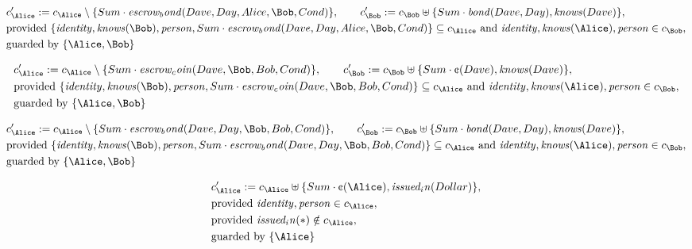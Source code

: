 \begin{align*}
&
c'_
{
\Alice
}
 := 
c_
{
\Alice
}
 \setminus 
\{
Sum
\cdot
\mathit{
escrow_bond
}
(
Dave
,
Day
,
Alice
,
\Bob
,
Cond
)
\}
, \qquad 
c'_
{
\Bob
}
 := 
c_
{
\Bob
}
 \uplus 
\{
Sum
\cdot
\mathit{
bond
}
(
Dave
,
Day
)
,
\mathit{
knows
}
(
Dave
)
\}
,\\
&
\text{provided } 
\{
\mathit{
identity
}
,
\mathit{
knows
}
(
\Bob
)
,
\mathit{
person
}
,
Sum
\cdot
\mathit{
escrow_bond
}
(
Dave
,
Day
,
Alice
,
\Bob
,
Cond
)
\}
 \subseteq c_
{
\Alice
}
 \text{ and } 
\mathit{
identity
}
,
\mathit{
knows
}
(
\Alice
)
,
\mathit{
person
}
 \in c_
{
\Bob
}
,\\
&
\text{guarded by } \{
\Alice
,
\Bob
\}
\end{align*}

\begin{align*}
&
c'_
{
\Alice
}
 := 
c_
{
\Alice
}
 \setminus 
\{
Sum
\cdot
\mathit{
escrow_coin
}
(
Dave
,
\Bob
,
Bob
,
Cond
)
\}
, \qquad 
c'_
{
\Bob
}
 := 
c_
{
\Bob
}
 \uplus 
\{
Sum
\cdot
\text{\textcent}
(
Dave
)
,
\mathit{
knows
}
(
Dave
)
\}
,\\
&
\text{provided } 
\{
\mathit{
identity
}
,
\mathit{
knows
}
(
\Bob
)
,
\mathit{
person
}
,
Sum
\cdot
\mathit{
escrow_coin
}
(
Dave
,
\Bob
,
Bob
,
Cond
)
\}
 \subseteq c_
{
\Alice
}
 \text{ and } 
\mathit{
identity
}
,
\mathit{
knows
}
(
\Alice
)
,
\mathit{
person
}
 \in c_
{
\Bob
}
,\\
&
\text{guarded by } \{
\Alice
,
\Bob
\}
\end{align*}

\begin{align*}
&
c'_
{
\Alice
}
 := 
c_
{
\Alice
}
 \setminus 
\{
Sum
\cdot
\mathit{
escrow_bond
}
(
Dave
,
Day
,
\Bob
,
Bob
,
Cond
)
\}
, \qquad 
c'_
{
\Bob
}
 := 
c_
{
\Bob
}
 \uplus 
\{
Sum
\cdot
\mathit{
bond
}
(
Dave
,
Day
)
,
\mathit{
knows
}
(
Dave
)
\}
,\\
&
\text{provided } 
\{
\mathit{
identity
}
,
\mathit{
knows
}
(
\Bob
)
,
\mathit{
person
}
,
Sum
\cdot
\mathit{
escrow_bond
}
(
Dave
,
Day
,
\Bob
,
Bob
,
Cond
)
\}
 \subseteq c_
{
\Alice
}
 \text{ and } 
\mathit{
identity
}
,
\mathit{
knows
}
(
\Alice
)
,
\mathit{
person
}
 \in c_
{
\Bob
}
,\\
&
\text{guarded by } \{
\Alice
,
\Bob
\}
\end{align*}

\begin{align*}
&
c'_
{
\Alice
}
 := 
c_
{
\Alice
}
 \uplus 
\{
Sum
\cdot
\text{\textcent}
(
\Alice
)
,
\mathit{
issued_in
}
(
Dollar
)
\}
,\\
&
\text{provided } 
\mathit{
identity
}
,
\mathit{
person
}
 \in c_
{
\Alice
}
,\\
&
\text{provided } 
\mathit{
issued_in
}
(
\ast
)
 \notin c_
{
\Alice
}
,\\
&
\text{guarded by } \{
\Alice
\}
\end{align*}
